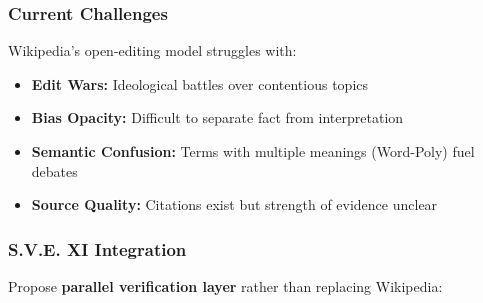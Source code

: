 \documentclass[11pt,a4paper]{article}
\theoremstyle{definition}
\theoremstyle{remark}
\begin{document}
\subsubsection{Current Challenges}

Wikipedia's open-editing model struggles with:
\begin{itemize}
    \item \textbf{Edit Wars:} Ideological battles over contentious topics
    \item \textbf{Bias Opacity:} Difficult to separate fact from interpretation
    \item \textbf{Semantic Confusion:} Terms with multiple meanings (Word-Poly) fuel debates
    \item \textbf{Source Quality:} Citations exist but strength of evidence unclear
\end{itemize}

\subsubsection{S.V.E. XI Integration}

Propose \textbf{parallel verification layer} rather than replacing Wikipedia:
\end{document}
